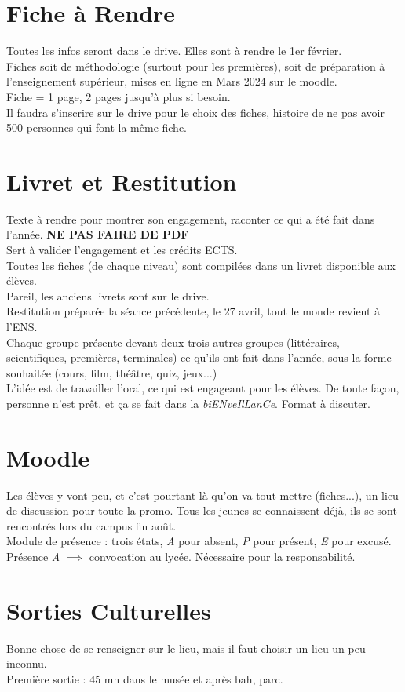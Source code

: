 \documentclass{cours}
\begin{document}
\section{Fiche à Rendre}
Toutes les infos seront dans le drive. Elles sont à rendre le 1er février. \\
Fiches soit de méthodologie (surtout pour les premières), soit de préparation à l'enseignement supérieur, mises en ligne en Mars 2024 sur le moodle. \\
Fiche = 1 page, 2 pages jusqu'à plus si besoin. \\
Il faudra s'inscrire sur le drive pour le choix des fiches, histoire de ne pas avoir 500 personnes qui font la même fiche. 

\section{Livret et Restitution}
Texte à rendre pour montrer son engagement, raconter ce qui a été fait dans l'année. \textbf{NE PAS FAIRE DE PDF}\\
Sert à valider l'engagement et les crédits ECTS.\\
Toutes les fiches (de chaque niveau) sont compilées dans un livret disponible aux élèves.\\
Pareil, les anciens livrets sont sur le drive.
\\
Restitution préparée la séance précédente, le 27 avril, tout le monde revient à l'ENS.\\
Chaque groupe présente devant deux trois autres groupes (littéraires, scientifiques, premières, terminales) ce qu'ils ont fait dans l'année, sous la forme souhaitée (cours, film, théâtre, quiz, jeux...)\\
L'idée est de travailler l'oral, ce qui est engageant pour les élèves. De toute façon, personne n'est prêt, et ça se fait dans la \textsl{biENveIlLanCe}. Format à discuter.

\section{Moodle}
Les élèves y vont peu, et c'est pourtant là qu'on va tout mettre (fiches...), un lieu de discussion pour toute la promo. Tous les jeunes se connaissent déjà, ils se sont rencontrés lors du campus fin août. \\
Module de présence : trois états, \textit{A} pour absent, \textit{P} pour présent, \textit{E} pour excusé. Présence \textit{A} $\implies$ convocation au lycée. Nécessaire pour la responsabilité.\\


\section{Sorties Culturelles}
Bonne chose de se renseigner sur le lieu, mais il faut choisir un lieu un peu inconnu. \\
Première sortie : 45 mn dans le musée et après bah, parc.   
\end{document}
